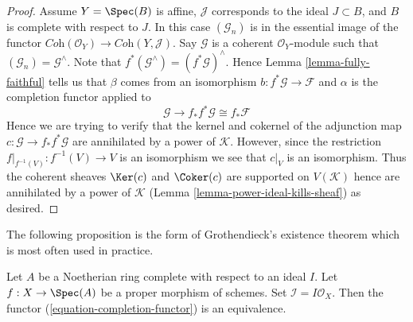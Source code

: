 \begin{proof}
\medskip\noindent
Assume $Y = \Spec(B)$ is affine, $\mathcal{J}$ corresponds to the ideal
$J \subset B$, and $B$ is complete with respect to $J$.
In this case $(\mathcal{G}_n)$ is in the essential image of the functor
$\textit{Coh}(\mathcal{O}_Y) \to \textit{Coh}(Y, \mathcal{J})$.
Say $\mathcal{G}$ is a coherent $\mathcal{O}_Y$-module such that
$(\mathcal{G}_n) = \mathcal{G}^\wedge$. Note that
$f^*(\mathcal{G}^\wedge) = (f^*\mathcal{G})^\wedge$. Hence
Lemma \ref{lemma-fully-faithful}
tells us that $\beta$ comes from an isomorphism
$b : f^*\mathcal{G} \to \mathcal{F}$
and $\alpha$ is the completion functor applied to
$$
\mathcal{G} \to f_*f^*\mathcal{G} \cong f_*\mathcal{F}
$$
Hence we are trying to verify that the kernel and cokernel of the
adjunction map $c : \mathcal{G} \to f_*f^*\mathcal{G}$ are annihilated by
a power of $\mathcal{K}$. However, since the restriction
$f|_{f^{-1}(V)} : f^{-1}(V) \to V$ is an isomorphism
we see that $c|_V$ is an isomorphism. Thus the coherent sheaves
$\Ker(c)$ and $\Coker(c)$ are supported on $V(\mathcal{K})$
hence are annihilated by a power of $\mathcal{K}$
(Lemma \ref{lemma-power-ideal-kills-sheaf}) as desired.
\end{proof}

\noindent
The following proposition is the form of Grothendieck's existence
theorem which is most often used in practice.

\begin{proposition}
\label{proposition-existence-proper}
Let $A$ be a Noetherian ring complete with respect to an ideal $I$.
Let $f : X \to \Spec(A)$ be a proper morphism of schemes.
Set $\mathcal{I} = I\mathcal{O}_X$.
Then the functor (\ref{equation-completion-functor}) is an equivalence.
\end{proposition}

